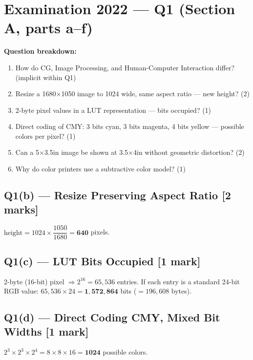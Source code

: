 \documentclass[12pt, a4paper]{article}
\newenvironment{solutionbox}{\begin{mdframed}[style=solutionframe]}{\end{mdframed}}
\newenvironment{answerbox}{\begin{mdframed}[style=answerframe]}{\end{mdframed}}
\begin{document}
\section{Examination 2022 --- Q1 (Section A, parts a--f)}

\begin{solutionbox}
\textbf{Question breakdown:}
\begin{enumerate}[noitemsep]
  \item[(a)] How do CG, Image Processing, and Human-Computer Interaction differ? (implicit within Q1)
  \item[(b)] Resize a 1680$\times$1050 image to 1024 wide, same aspect ratio --- new height? (2)
  \item[(c)] 2-byte pixel values in a LUT representation --- bits occupied? (1)
  \item[(d)] Direct coding of CMY: 3 bits cyan, 3 bits magenta, 4 bits yellow --- possible colors per pixel? (1)
  \item[(e)] Can a 5$\times$3.5in image be shown at 3.5$\times$4in without geometric distortion? (2)
  \item[(f)] Why do color printers use a subtractive color model? (1)
\end{enumerate}
\end{solutionbox}

\subsection*{Q1(b) --- Resize Preserving Aspect Ratio [2 marks]}
\begin{answerbox}
$\text{height} = 1024 \times \dfrac{1050}{1680} = \mathbf{640}$ pixels.
\end{answerbox}

\subsection*{Q1(c) --- LUT Bits Occupied [1 mark]}
\begin{answerbox}
2-byte (16-bit) pixel $\Rightarrow 2^{16} = 65{,}536$ entries. If each entry is a standard 24-bit RGB value: $65{,}536 \times 24 = \mathbf{1{,}572{,}864}$ bits ($=196{,}608$ bytes).
\end{answerbox}

\subsection*{Q1(d) --- Direct Coding CMY, Mixed Bit Widths [1 mark]}
\begin{answerbox}
$2^3 \times 2^3 \times 2^4 = 8 \times 8 \times 16 = \mathbf{1024}$ possible colors.
\end{answerbox}
\end{document}
